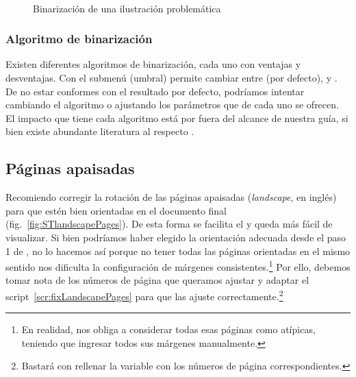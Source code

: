 \documentclass[%
	a5paper,
	10pt,
	twoside,
	openright,
	final,
]{memoir}
\begin{document}
	\begin{figure}
		\hspace*{\fill}
		\hfill
		\hspace*{\fill}\\
		\hspace*{\fill}
		\hfill
		\hspace*{\fill}
		\caption{Binarización de una ilustración problemática\label{fig:SToutputBadDiagrams}}
	\end{figure}

	\subsubsection{Algoritmo de binarización} Existen diferentes algoritmos de binarización, cada uno con ventajas y desventajas. Con el submenú  (umbral) \scantailor permite cambiar entre  (por defecto),  y . De no estar conformes con el resultado por defecto, podríamos intentar cambiando el algoritmo o ajustando los parámetros que de cada uno se ofrecen. El impacto que tiene cada algoritmo está por fuera del alcance de nuestra guía, si bien existe abundante literatura al respecto \cite{RashmiBinarization}.

	\subsection{Páginas apaisadas\label{sec:landscapePages}} Recomiendo corregir la rotación de las páginas apaisadas (\emph{landscape}, en inglés) para que estén bien orientadas en el documento final (fig.~\ref{fig:STlandscapePages}). De esta forma se facilita el \ocr y queda más fácil de visualizar. Si bien podríamos haber elegido la orientación adecuada desde el paso 1 de \scantailor, no lo hacemos así porque no tener todas las páginas orientadas en el mismo sentido nos dificulta la configuración de márgenes consistentes.\footnote{En realidad, nos obliga a considerar todas esas páginas como atípicas, teniendo que ingresar todos sus márgenes manualmente.} Por ello, debemos tomar nota de los números de página que queramos ajustar y adaptar el script~\ref{scr:fixLandscapePages} para que las ajuste correctamente.\footnote{Bastará con rellenar la variable  con los números de página correspondientes.}
\end{document}
